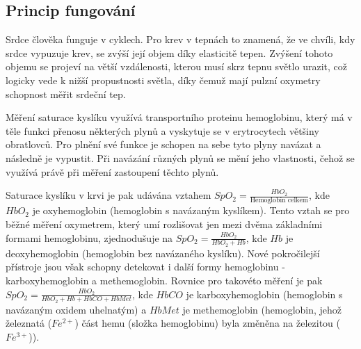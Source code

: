 \subsection {Princip fungování}
Srdce člověka funguje v cyklech. Pro krev v tepnách to znamená, že ve chvíli, kdy srdce vypuzuje krev, se zvýší její objem díky elasticitě tepen. Zvýšení tohoto objemu se projeví na větší vzdálenosti, kterou musí skrz tepnu světlo urazit, což logicky vede k nižší propustnosti světla, díky čemuž mají pulzní oxymetry schopnost měřit srdeční tep.
\par Měření saturace kyslíku využívá transportního proteinu hemoglobinu, který má v těle funkci přenosu některých plynů a vyskytuje se v erytrocytech většiny obratlovců. Pro plnění své funkce je schopen na sebe tyto plyny navázat a následně je vypustit. Při navázání různých plynů se mění jeho vlastnosti, čehož se využívá právě při měření zastoupení těchto plynů.
\par Saturace kyslíku v krvi je pak udávána vztahem $SpO_2 = \frac{HbO_2}{\text{Hemoglobin celkem}}$, kde $HbO_2$ je oxyhemoglobin (hemoglobin s navázaným kyslíkem). Tento vztah se pro běžné měření oxymetrem, který umí rozlišovat jen mezi dvěma základními formami hemoglobinu, zjednodušuje na $SpO_2 = \frac{HbO_2}{HbO_2+Hb}$, kde $Hb$ je deoxyhemoglobin (hemoglobin bez navázaného kyslíku). Nové pokročilejší přístroje jsou však schopny detekovat i další formy hemoglobinu - karboxyhemoglobin a methemoglobin. Rovnice pro takovéto měření je pak $SpO_2 = \frac{HbO_2}{HbO_2+Hb+HbCO+HbMet}$, kde $HbCO$ je karboxyhemoglobin (hemoglobin s navázaným oxidem uhelnatým) a $HbMet$ je methemoglobin (hemoglobin, jehož železnatá ($Fe^{2+}$) část hemu (složka hemoglobinu) byla změněna na železitou ($Fe^{3+}$)). 
